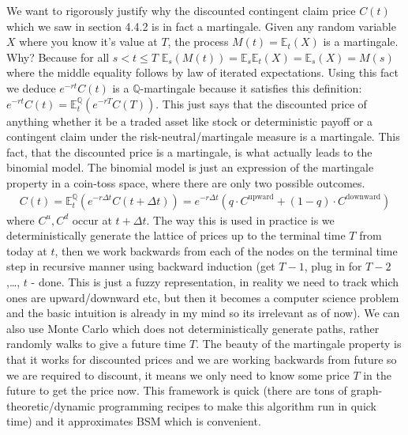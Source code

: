 \documentclass[9pt]{extarticle}
\begin{document}
We want to rigorously justify why the discounted contingent claim price $C(t)$ which we saw in section 4.4.2 is in fact a martingale. 
Given any random variable $X$ where you know it's value at $T$, the process $M(t) = \mathbb{E}_t(X)$ is a martingale. Why? 
Because for all $s<t\leq T$ $\mathbb{E}_s(M(t)) = \mathbb{E}_s\mathbb{E}_t(X) = \mathbb{E}_s(X) = M(s)$ where 
the middle equality follows by law of iterated expectations. Using this fact we deduce $e^{-rt}C(t)$ is a $\mathbb{Q}$-martingale 
because it satisfies this definition: $e^{-rt}C(t) = \mathbb{E}_t^\mathbb{Q}(e^{-rT}C(T))$. This just says that the discounted price of anything 
whether it be a traded asset like stock or deterministic payoff or a contingent claim under the risk-neutral/martingale measure is a martingale. This fact, that 
the discounted price is a martingale, is what actually leads to the binomial model. The binomial model is just an expression of the martingale 
property in a coin-toss space, where there are only two possible outcomes.
\begin{align}\label{euro}
  C(t) = \mathbb{E}_t^\mathbb{Q}(e^{-r\Delta t} C(t+\Delta t)) = e^{-r\Delta t}(q\cdot C^{\text{upward}} + (1-q)\cdot C^{\text{downward}})
\end{align}
where $C^u,C^d$ occur at $t+\Delta t$. The way this is used in practice is we deterministically generate the lattice of prices up to the terminal time $T$ from today at $t$, then we work backwards 
from each of the nodes on the terminal time step in recursive manner using backward induction (get $T-1$, plug in for $T-2$,\ldots, $t$ - done. This is just a fuzzy 
representation, in reality we need to track which ones are upward/downward etc, but then it becomes a computer science problem and the basic intuition is already in my mind so its 
irrelevant as of now). We can also use Monte Carlo which does not deterministically generate paths, rather randomly walks to 
give a future time $T$. The beauty of the martingale property is that it works for discounted prices and we are working backwards from 
future so we are required to discount, it means we only need to know some price $T$ in the future to get the price now. This framework 
is quick (there are tons of graph-theoretic/dynamic programming recipes to make this algorithm run in quick time) and it approximates BSM which is 
convenient.
\end{document}
